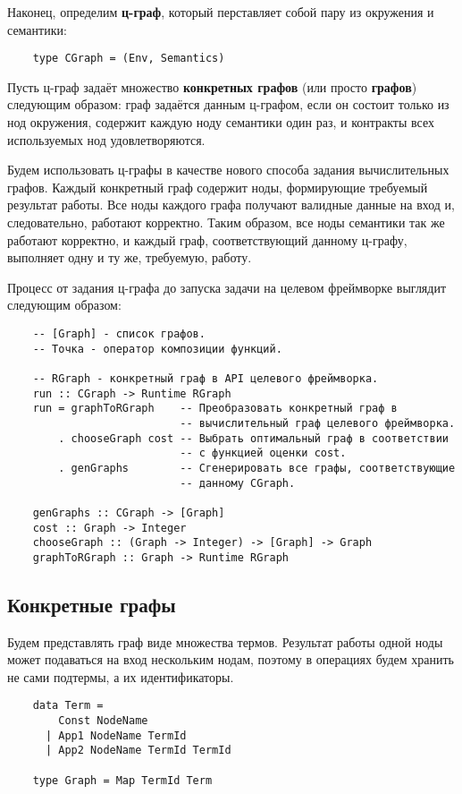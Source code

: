 Наконец, определим \textbf{ц-граф}, который перставляет собой пару из окружения и семантики:
\begin{lstlisting}
    type CGraph = (Env, Semantics)
\end{lstlisting}

Пусть ц-граф задаёт множество \textbf{конкретных графов} (или просто \textbf{графов}) следующим образом:
граф задаётся данным ц-графом, если он состоит только из нод окружения, содержит каждую ноду семантики один раз, и контракты всех используемых нод удовлетворяются.

Будем использовать ц-графы в качестве нового способа задания вычислительных графов.
Каждый конкретный граф содержит ноды, формирующие требуемый результат работы.
Все ноды каждого графа получают валидные данные на вход и, следовательно, работают корректно.
Таким образом, все ноды семантики так же работают корректно, и каждый граф, соответствующий данному ц-графу, выполняет одну и ту же, требуемую, работу.

Процесс от задания ц-графа до запуска задачи на целевом фреймворке выглядит следующим образом:
\begin{lstlisting}
    -- [Graph] - список графов.
    -- Точка - оператор композиции функций.

    -- RGraph - конкретный граф в API целевого фреймворка.
    run :: CGraph -> Runtime RGraph
    run = graphToRGraph    -- Преобразовать конкретный граф в
                           -- вычислительный граф целевого фреймворка.
        . chooseGraph cost -- Выбрать оптимальный граф в соответствии
                           -- с функцией оценки cost.
        . genGraphs        -- Сгенерировать все графы, соответствующие
                           -- данному CGraph.

    genGraphs :: CGraph -> [Graph]
    cost :: Graph -> Integer
    chooseGraph :: (Graph -> Integer) -> [Graph] -> Graph
    graphToRGraph :: Graph -> Runtime RGraph
\end{lstlisting}


\subsection{Конкретные графы}

Будем представлять граф виде множества термов. Результат работы одной ноды может подаваться на вход нескольким нодам, поэтому в операциях будем хранить не сами подтермы, а их идентификаторы.

\begin{lstlisting}
    data Term =
        Const NodeName
      | App1 NodeName TermId
      | App2 NodeName TermId TermId

    type Graph = Map TermId Term
\end{lstlisting}


